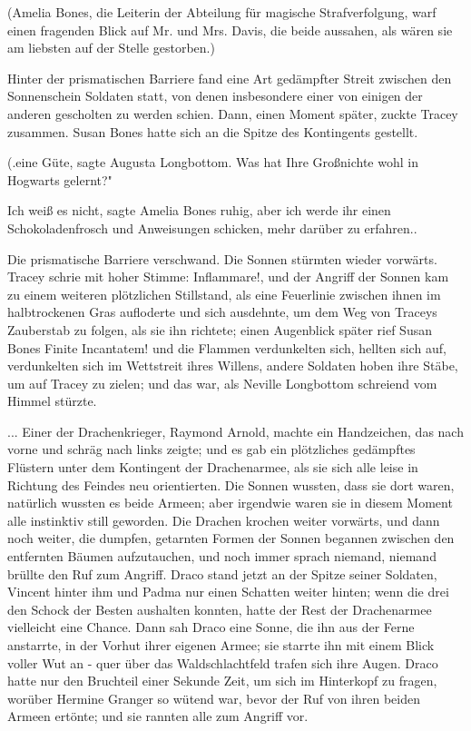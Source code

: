 (Amelia Bones, die Leiterin der Abteilung für magische Strafverfolgung, warf
einen fragenden Blick auf Mr. und Mrs. Davis, die beide aussahen, als wären sie
am liebsten auf der Stelle gestorben.)

Hinter der prismatischen Barriere fand eine Art gedämpfter Streit zwischen den
Sonnenschein Soldaten statt, von denen insbesondere einer von einigen der
anderen gescholten zu werden schien. Dann, einen Moment später, zuckte Tracey
zusammen. Susan Bones hatte sich an die Spitze des Kontingents gestellt.

(\grqq{}.eine Güte\grqq{}, sagte Augusta Longbottom. \glqq Was hat Ihre
Großnichte wohl in Hogwarts gelernt?"

\glqq Ich weiß es nicht\grqq{}, sagte Amelia Bones ruhig, \glqq aber ich werde
ihr einen Schokoladenfrosch und Anweisungen schicken, mehr darüber zu
erfahren.\grqq{}.

Die prismatische Barriere verschwand. Die Sonnen stürmten wieder vorwärts.
Tracey schrie mit hoher Stimme: \glqq Inflammare!\grqq{}, und der Angriff der
Sonnen kam zu einem weiteren plötzlichen Stillstand, als eine Feuerlinie
zwischen ihnen im halbtrockenen Gras aufloderte und sich ausdehnte, um dem Weg
von Traceys Zauberstab zu folgen, als sie ihn richtete; einen Augenblick später
rief Susan Bones \glqq Finite Incantatem!\grqq{} und die Flammen verdunkelten
sich, hellten sich auf, verdunkelten sich im Wettstreit ihres Willens, andere
Soldaten hoben ihre Stäbe, um auf Tracey zu zielen; und das war, als Neville
Longbottom schreiend vom Himmel stürzte.

... Einer der Drachenkrieger, Raymond Arnold, machte ein Handzeichen, das nach
vorne und schräg nach links zeigte; und es gab ein plötzliches gedämpftes
Flüstern unter dem Kontingent der Drachenarmee, als sie sich alle leise in
Richtung des Feindes neu orientierten. Die Sonnen wussten, dass sie dort waren,
natürlich wussten es beide Armeen; aber irgendwie waren sie in diesem Moment
alle instinktiv still geworden. Die Drachen krochen weiter vorwärts, und dann
noch weiter, die dumpfen, getarnten Formen der Sonnen begannen zwischen den
entfernten Bäumen aufzutauchen, und noch immer sprach niemand, niemand brüllte
den Ruf zum Angriff. Draco stand jetzt an der Spitze seiner Soldaten, Vincent
hinter ihm und Padma nur einen Schatten weiter hinten; wenn die drei den Schock
der Besten aushalten konnten, hatte der Rest der Drachenarmee vielleicht eine
Chance. Dann sah Draco eine Sonne, die ihn aus der Ferne anstarrte, in der
Vorhut ihrer eigenen Armee; sie starrte ihn mit einem Blick voller Wut an - quer
über das Waldschlachtfeld trafen sich ihre Augen. Draco hatte nur den Bruchteil
einer Sekunde Zeit, um sich im Hinterkopf zu fragen, worüber Hermine Granger so
wütend war, bevor der Ruf von ihren beiden Armeen ertönte; und sie rannten alle
zum Angriff vor.

